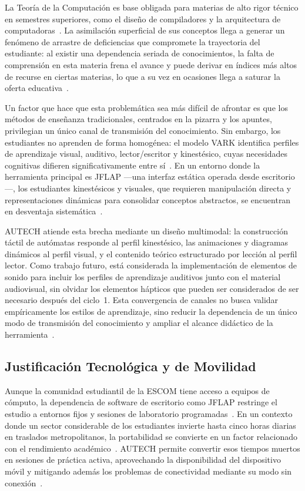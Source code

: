 La Teoría de la Computación es base obligada para materias de alto rigor técnico en semestres
superiores, como el diseño de compiladores y la arquitectura de
computadoras~\cite{ipn2020, aho2006}. La asimilación superficial de sus conceptos llega a
generar un fenómeno de arrastre de deficiencias que compromete la trayectoria del estudiante:
al existir una dependencia seriada de conocimientos, la falta de comprensión en esta materia
frena el avance y puede derivar en índices más altos de recurse en ciertas materias, lo que a
su vez en ocasiones llega a saturar la oferta educativa~\cite{tinto1987}.

Un factor que hace que esta problemática sea más difícil de afrontar es que los métodos de
enseñanza tradicionales, centrados en la pizarra y los apuntes, privilegian un único canal de
transmisión del conocimiento. Sin embargo, los estudiantes no aprenden de forma homogénea:
el modelo VARK identifica perfiles de aprendizaje visual, auditivo, lector/escritor y
kinestésico, cuyas necesidades cognitivas difieren significativamente entre
sí~\cite{fleming1992}. En un entorno donde la herramienta principal es JFLAP ---una interfaz
estática operada desde escritorio---, los estudiantes kinestésicos y visuales, que requieren
manipulación directa y representaciones dinámicas para consolidar conceptos abstractos, se
encuentran en desventaja sistemática~\cite{felder2016}.

AUTECH atiende esta brecha mediante un diseño multimodal: la construcción táctil de autómatas
responde al perfil kinestésico, las animaciones y diagramas dinámicos al perfil visual, y el
contenido teórico estructurado por lección al perfil lector. Como trabajo futuro, está
considerada la implementación de elementos de sonido para incluir los perfiles de aprendizaje
auditivos junto con el material audiovisual, sin olvidar los elementos hápticos que pueden ser
considerados de ser necesario después del ciclo~1. Esta convergencia de canales no busca validar
empíricamente los estilos de aprendizaje, sino reducir la dependencia de un único modo de
transmisión del conocimiento y ampliar el alcance didáctico de la
herramienta~\cite{felder2016, sweller1988}.

\subsection{Justificación Tecnológica y de Movilidad}
\label{ssec:just_tecnologica}

Aunque la comunidad estudiantil de la ESCOM tiene acceso a equipos de cómputo, la dependencia
de software de escritorio como JFLAP restringe el estudio a entornos fijos y sesiones de
laboratorio programadas~\cite{rodger2006}. En un contexto donde un sector considerable de los
estudiantes invierte hasta cinco horas diarias en traslados metropolitanos, la portabilidad se
convierte en un factor relacionado con el rendimiento académico~\cite{kukulska2007}. AUTECH
permite convertir esos tiempos muertos en sesiones de práctica activa, aprovechando la
disponibilidad del dispositivo móvil y mitigando además los problemas de conectividad mediante
su modo sin conexión~\cite{crompton2018, materialdesign2023}.


